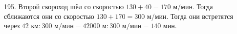 195. Второй скороход шёл со скоростью $130+40=170$ м/мин. Тогда сближаются они со скоростью $130+170=300$ м/мин. Тогда они встретятся через $42\text{ км}:300\text{ м/мин}=42000\text{ м}:300\text{ м/мин}=140\text{ мин.}$\\
